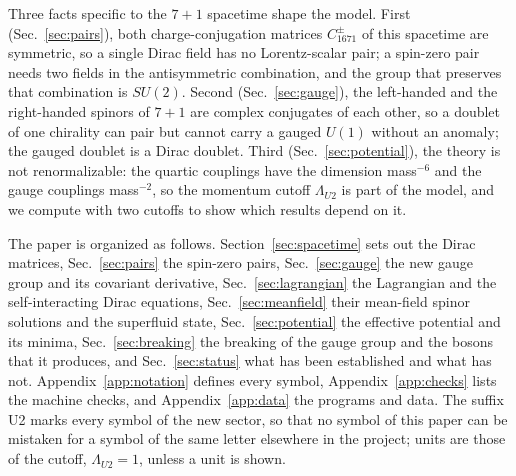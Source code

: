 Three facts specific to the $7+1$ spacetime shape the model. First (Sec.~\ref{sec:pairs}),
both charge-conjugation matrices $C^\pm_{1671}$ of this spacetime are symmetric, so a single
Dirac field has no Lorentz-scalar pair; a spin-zero pair needs two fields in the antisymmetric
combination, and the group that preserves that combination is $SU(2)$. Second
(Sec.~\ref{sec:gauge}), the left-handed and the right-handed spinors of $7+1$ are complex
conjugates of each other, so a doublet of one chirality can pair but cannot carry a gauged
$U(1)$ without an anomaly; the gauged doublet is a Dirac doublet. Third (Sec.~\ref{sec:potential}),
the theory is not renormalizable: the quartic couplings have the dimension mass$^{-6}$ and the
gauge couplings mass$^{-2}$, so the momentum cutoff $\Lambda_{U2}$ is part of the model, and we
compute with two cutoffs to show which results depend on it.

The paper is organized as follows. Section~\ref{sec:spacetime} sets out the Dirac matrices,
Sec.~\ref{sec:pairs} the spin-zero pairs, Sec.~\ref{sec:gauge} the new gauge group and its
covariant derivative, Sec.~\ref{sec:lagrangian} the Lagrangian and the self-interacting Dirac
equations, Sec.~\ref{sec:meanfield} their mean-field spinor solutions and the superfluid state,
Sec.~\ref{sec:potential} the effective potential and its minima, Sec.~\ref{sec:breaking} the
breaking of the gauge group and the bosons that it produces, and Sec.~\ref{sec:status} what has
been established and what has not. Appendix~\ref{app:notation} defines every symbol,
Appendix~\ref{app:checks} lists the machine checks, and Appendix~\ref{app:data} the programs and
data. The suffix U2 marks every symbol of the new sector, so that no symbol of this paper can
be mistaken for a symbol of the same letter elsewhere in the project; units are those of the
cutoff, $\Lambda_{U2}=1$, unless a unit is shown.
